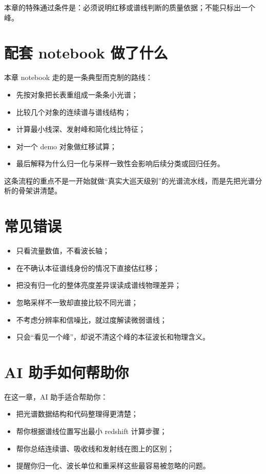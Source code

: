 本章的特殊通过条件是：必须说明红移或谱线判断的质量依据；不能只标出一个峰。

\section{配套 notebook 做了什么}

本章 notebook 走的是一条典型而克制的路线：

\begin{itemize}
    \item 先按对象把长表重组成一条条小光谱；
    \item 比较几个对象的连续谱与谱线结构；
    \item 计算最小线深、发射峰和简化线比特征；
    \item 对一个 demo 对象做红移试算；
    \item 最后解释为什么归一化与采样一致性会影响后续分类或回归任务。
\end{itemize}

这条流程的重点不是一开始就做“真实大巡天级别”的光谱流水线，而是先把光谱分析的骨架讲清楚。

\section{常见错误}

\begin{warnbox}[光谱数据中的典型问题]
\begin{itemize}
    \item 只看流量数值，不看波长轴；
    \item 在不确认本征谱线身份的情况下直接估红移；
    \item 把没有归一化的整体亮度差异误读成谱线物理差异；
    \item 忽略采样不一致却直接比较不同光谱；
    \item 不考虑分辨率和信噪比，就过度解读微弱谱线；
    \item 只会“看见一个峰”，却说不清这个峰的本征波长和物理含义。
\end{itemize}
\end{warnbox}

\section{AI 助手如何帮助你}

在这一章，AI 助手适合帮助你：

\begin{itemize}
    \item 把光谱数据结构和代码整理得更清楚；
    \item 帮你根据谱线位置写出最小 redshift 计算步骤；
    \item 帮你总结连续谱、吸收线和发射线在图上的区别；
    \item 提醒你归一化、波长单位和重采样这些最容易被忽略的问题。
\end{itemize}

